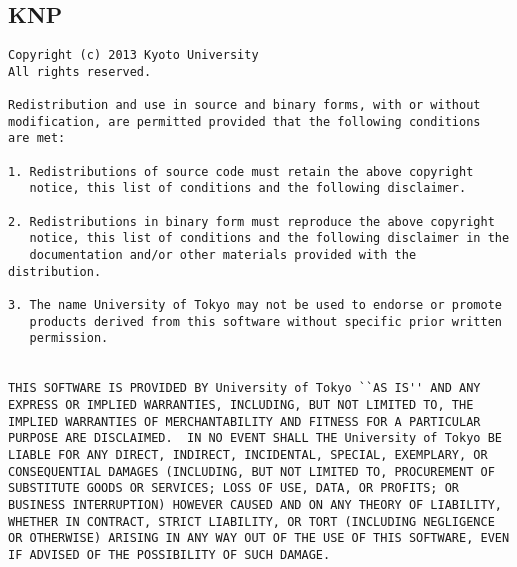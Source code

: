 \subsection{KNP}
\begin{Verbatim}[baselinestretch=0.7,frame=single]
Copyright (c) 2013 Kyoto University
All rights reserved.

Redistribution and use in source and binary forms, with or without
modification, are permitted provided that the following conditions
are met:

1. Redistributions of source code must retain the above copyright
   notice, this list of conditions and the following disclaimer.

2. Redistributions in binary form must reproduce the above copyright
   notice, this list of conditions and the following disclaimer in the
   documentation and/or other materials provided with the distribution.

3. The name University of Tokyo may not be used to endorse or promote
   products derived from this software without specific prior written
   permission.


THIS SOFTWARE IS PROVIDED BY University of Tokyo ``AS IS'' AND ANY
EXPRESS OR IMPLIED WARRANTIES, INCLUDING, BUT NOT LIMITED TO, THE
IMPLIED WARRANTIES OF MERCHANTABILITY AND FITNESS FOR A PARTICULAR
PURPOSE ARE DISCLAIMED.  IN NO EVENT SHALL THE University of Tokyo BE
LIABLE FOR ANY DIRECT, INDIRECT, INCIDENTAL, SPECIAL, EXEMPLARY, OR
CONSEQUENTIAL DAMAGES (INCLUDING, BUT NOT LIMITED TO, PROCUREMENT OF
SUBSTITUTE GOODS OR SERVICES; LOSS OF USE, DATA, OR PROFITS; OR
BUSINESS INTERRUPTION) HOWEVER CAUSED AND ON ANY THEORY OF LIABILITY,
WHETHER IN CONTRACT, STRICT LIABILITY, OR TORT (INCLUDING NEGLIGENCE
OR OTHERWISE) ARISING IN ANY WAY OUT OF THE USE OF THIS SOFTWARE, EVEN
IF ADVISED OF THE POSSIBILITY OF SUCH DAMAGE.
\end{Verbatim}




